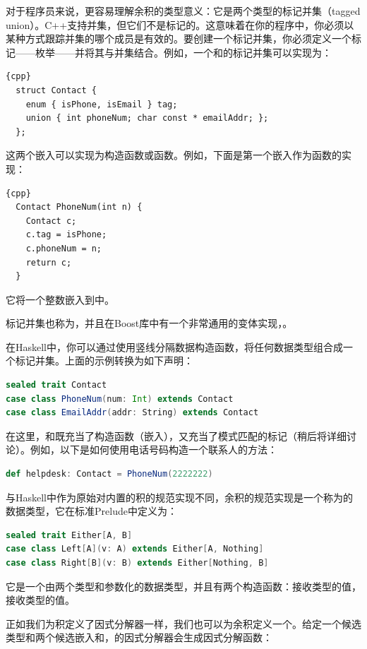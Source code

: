 对于程序员来说，更容易理解余积的类型意义：它是两个类型的标记并集（tagged union）。C++支持并集，但它们不是标记的。这意味着在你的程序中，你必须以某种方式跟踪并集的哪个成员是有效的。要创建一个标记并集，你必须定义一个标记——枚举——并将其与并集结合。例如，一个和的标记并集可以实现为：

\begin{lstlisting}{cpp}
  struct Contact {
    enum { isPhone, isEmail } tag;
    union { int phoneNum; char const * emailAddr; };
  };
\end{lstlisting}
这两个嵌入可以实现为构造函数或函数。例如，下面是第一个嵌入作为函数的实现：

\begin{lstlisting}{cpp}
  Contact PhoneNum(int n) {
    Contact c;
    c.tag = isPhone;
    c.phoneNum = n;
    return c;
  }
\end{lstlisting}
它将一个整数嵌入到中。

标记并集也称为，并且在Boost库中有一个非常通用的变体实现，。

在Haskell中，你可以通过使用竖线分隔数据构造函数，将任何数据类型组合成一个标记并集。上面的示例转换为如下声明：

\begin{lstlisting}[language=Scala]
sealed trait Contact
case class PhoneNum(num: Int) extends Contact
case class EmailAddr(addr: String) extends Contact
\end{lstlisting}
在这里，和既充当了构造函数（嵌入），又充当了模式匹配的标记（稍后将详细讨论）。例如，以下是如何使用电话号码构造一个联系人的方法：

\begin{lstlisting}[language=Scala]
def helpdesk: Contact = PhoneNum(2222222)
\end{lstlisting}
与Haskell中作为原始对内置的积的规范实现不同，余积的规范实现是一个称为的数据类型，它在标准Prelude中定义为：

\begin{lstlisting}[language=Scala]
sealed trait Either[A, B]
case class Left[A](v: A) extends Either[A, Nothing]
case class Right[B](v: B) extends Either[Nothing, B]
\end{lstlisting}
它是一个由两个类型和参数化的数据类型，并且有两个构造函数：接收类型的值，接收类型的值。

正如我们为积定义了因式分解器一样，我们也可以为余积定义一个。给定一个候选类型和两个候选嵌入和，的因式分解器会生成因式分解函数：

